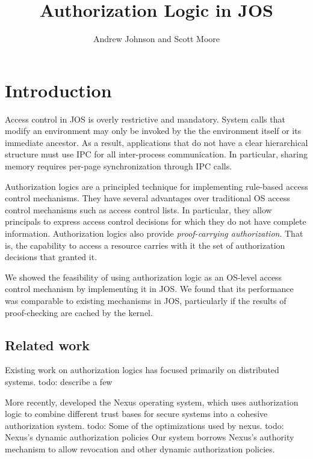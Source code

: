 \documentclass[10pt]{article}
\newcommand{\todo}[1]{{\color{red}todo: {#1}}}
\begin{document}
\title{Authorization Logic in JOS}
\author{Andrew Johnson and Scott Moore}

\maketitle

\thispagestyle{empty}

\setlength\parindent{0em}
\setlength\parskip{1em}

\section{Introduction}
Access control in JOS is overly restrictive and mandatory. System calls that modify an environment may only be invoked by the the environment itself or its immediate ancestor. As a result, applications that do not have a clear hierarchical structure must use IPC for all inter-process communication. In particular, sharing memory requires per-page synchronization through IPC calls.

Authorization logics are a principled technique for implementing rule-based access control mechanisms.
They have several advantages over traditional OS access control mechanisms such as access control lists.
In particular, they allow principals to express access control decisions for which they do not have complete information.
Authorization logics also provide \emph{proof-carrying authorization}. That is, the capability to access a resource carries with it the set of authorization decisions that granted it.

We showed the feasibility of using authorization logic as an OS-level access control mechanism by implementing it in JOS. We found that its performance was comparable to existing mechanisms in JOS, particularly if the results of proof-checking are cached by the kernel.

\subsection{Related work}
Existing work on authorization logics has focused primarily on distributed systems. \todo{describe a few}

More recently, \citet{Nexus} developed the Nexus operating system, which uses authorization logic to combine different trust bases for secure systems into a cohesive authorization system.
\todo{Some of the optimizations used by nexus}. \todo{Nexus's dynamic authorization policies}
Our system borrows Nexus's authority mechanism to allow revocation and other dynamic authorization policies.
\end{document}
